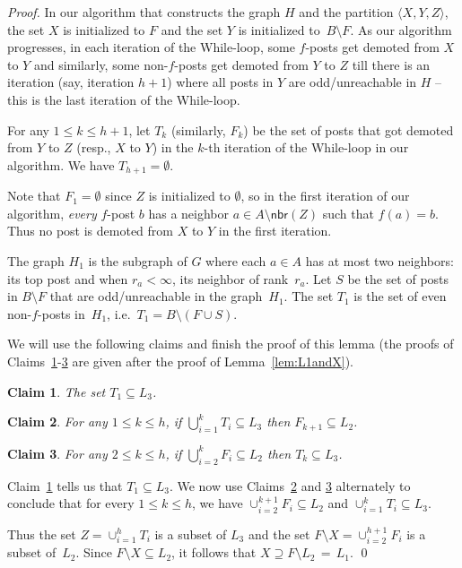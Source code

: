 \documentclass[11pt]{llncs}
\newtheorem{new-claim}{Claim}
\newcommand{\Nbr}{\mathsf{nbr}}
\begin{document}
\begin{proof}
In our algorithm that constructs the graph $H$ and the partition $\langle X, Y, Z\rangle$, the 
set $X$ is initialized to $F$ and the set $Y$ is initialized to~$B \setminus F$. As our algorithm 
progresses, in each iteration of the While-loop, some $f$-posts get demoted from $X$ to $Y$ and similarly, 
some non-$f$-posts get demoted from $Y$ to $Z$ till there is an iteration (say, iteration $h+1$) where all 
posts in $Y$ are odd/unreachable in $H$ -- this is the last iteration of the While-loop. 

For any $1 \le k \le h+1$,  let $T_k$ (similarly, $F_k$) be the set of posts that got 
demoted from $Y$ to $Z$ (resp., $X$ to $Y$) in the $k$-th iteration of the While-loop in our algorithm. We have $T_{h+1} = \emptyset$.


Note that $F_1 = \emptyset$ since $Z$ is initialized to $\emptyset$, so
in the first iteration of our algorithm, {\em every} $f$-post $b$ has a neighbor $a \in A\setminus\Nbr(Z)$ such that $f(a) = b$. 
Thus no post is demoted from $X$ to $Y$ in the first iteration. 

The graph $H_1$ is the subgraph of $G$ where each $a \in A$ has at most two neighbors: 
its top post and when $r_a < \infty$, its neighbor of rank~$r_a$. 
Let $S$ be the set of posts in $B \setminus F$ that are odd/unreachable in the graph~$H_1$. 
The set $T_1$ is the set of even non-$f$-posts in~$H_1$,
i.e.\ $T_1 = B \setminus (F \cup S)$. 

We will use the following claims and finish the proof of this lemma
(the proofs of Claims~\ref{lemma-T}-\ref{lem:Z1} are given after the proof of Lemma~\ref{lem:L1andX}).


\begin{new-claim}
\label{lemma-T}
The set $T_1 \subseteq L_3$.
\end{new-claim}

\begin{new-claim}
\label{lem:F1}
For any $1 \le k \le h$, if $\bigcup_{i=1}^k T_i \subseteq L_3$ then $F_{k+1} \subseteq L_2$.
\end{new-claim}


\begin{new-claim}
\label{lem:Z1}
For any $2 \le k \le h$, if $\bigcup_{i=2}^k F_i \subseteq L_2$ then $T_k \subseteq L_3$. 
\end{new-claim}

Claim~\ref{lemma-T} tells us that $T_1 \subseteq L_3$. We now use Claims~\ref{lem:F1} and \ref{lem:Z1} 
alternately to conclude that for
every $1 \le k \le h$, we have $\cup_{i=2}^{k+1} F_i \subseteq L_2$ and $\cup_{i=1}^k T_i \subseteq L_3$.

\smallskip

Thus the set $Z = \cup_{i=1}^h T_i$ is a subset of $L_3$ and the set $F \setminus X = \cup_{i=2}^{h+1} F_i$ 
is a subset of~$L_2$. Since $F \setminus X \subseteq L_2$, it follows that $X \supseteq  F \setminus L_2 \, = \, L_1$. \qed
\end{proof}
\end{document}
